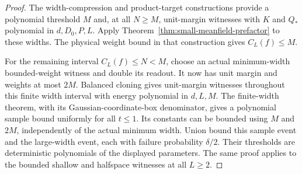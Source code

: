 \begin{proof}
The width-compression and product-target constructions provide a
polynomial threshold $M$ and, at all $N\ge M$, unit-margin witnesses
with $K$ and $Q_*$ polynomial in $d,D_0,P,L$. Apply
Theorem~\ref{thm:small-meanfield-prefactor} to these widths. The physical
weight bound in that construction gives $C_L(f)\le M$.

For the remaining interval $C_L(f)\le N<M$, choose an actual
minimum-width bounded-weight witness and double its readout. It now
has unit margin and weights at most $2M$. Balanced cloning gives
unit-margin witnesses throughout this finite width interval with
energy polynomial in $d,L,M$. The finite-width theorem, with its
Gaussian-coordinate-box denominator, gives a polynomial sample bound
uniformly for all $t\le1$. Its constants can be bounded using $M$
and $2M$, independently of the actual minimum width. Union bound
this sample event and the large-width event, each with failure
probability $\delta/2$. Their thresholds are deterministic
polynomials of the displayed parameters. The same proof applies to
the bounded shallow and halfspace witnesses at all $L\ge2$.
\end{proof}
